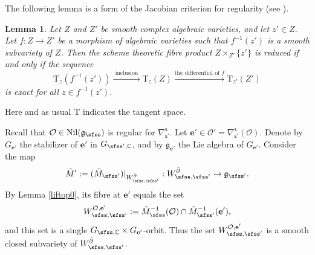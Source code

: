 \documentclass[12pt,a4paper]{amsart}
\newcommand{\CO}{{\mathcal {O}}}
\newcommand{\g}{\mathfrak g}
\newcommand{\X}{\mathbf{X}}
\def\DD{\nabla}
\newcommand{\be}{\begin {equation}}
\newcommand{\ee}{\end {equation}}
\numberwithin{equation}{section}
\newtheorem{lem}[thm]{Lemma}
\theoremstyle{remark}
\def\cOp{\cO^{\prime}}
\begin{document}
\def\Ks{{K}_{\sfss,\bC}}
\def\Ksp{{K}_{\sfss',\bC}}
\def\Kspo{{K}_{\sfss'_0,\bC}}
\def\Kspt{{K}_{\sfss'_1,\bC}}

\def\Gs{{G}_{\sfss}}
\def\Gsp{{G}_{\sfss'}}
\def\Gspo{{G}_{\sfss'_0}}
\def\Gspt{{G}_{\sfss'_1}}
\def\CMs{{\tilde M}_{\sfss}}
\def\CMsp{{\tilde M}_{\sfss'}}
\def\CMss{{\tilde M}_{\sfss,\sfss'}}
\def\Wss{{W_{\sfss,\sfss'}}}
\def\Woss{{W^{\circ}_{\sfss,\sfss'}}}
\def\CXss{\cX_{\sfss,\sfss'}}
\def\X{\bfee}
\def\Xp{{\bfee'}}
\def\Xpo{{\bfee'_0}}
\def\ww{\phi}
\def\wwo{\phi_0}
\def\sOp{\sO'}
\def\fggpsb{{\fgg^{\boxslash}_{\sfss'}}}
\def\fpppsb{{\fpp^{\boxslash}_{\sfss'}}}
\def\fpppso{\fpp_{\sfss'_0}}
\def\fpppst{\fpp_{\sfss'_1}}

\def\Vs{V_\sfss}
\def\Vsp{V_{\sfss'}}
\def\Vspp{V_{\sfss''}}
\def\Vspo{V_{\sfss'_0}}
\def\Vspt{V_{\sfss'_1}}
\def\Vspi{V_{\sfss'_i}}
\def\Wssi{W_{\sfss,\sfss'_i}}
\def\Wsso{W_{\sfss,\sfss'_0}}
\def\Wsst{W_{\sfss,\sfss'_1}}

\def\CXUO{\cX_{\sfss,\sfss'}^{\bar\partial ,\cOp}}
\def\CXOO{\cX_{\sfss,\sfss'}^{\cO ,\cOp}}



The following lemma is a form of  the Jacobian criterion for
regularity (see \cite[Theorem~2.19]{LiuAG}).
\begin{lem}\label{jacobic}
Let $Z$ and $Z'$ be smooth complex algebraic varieties, and let $z'\in Z$. Let $f: Z\rightarrow Z'$ be a morphism of algebraic varieties such that $f^{-1}(z')$ is a smooth subvariety of $Z$. Then the scheme theoretic fibre product $Z\times_{Z'} \{z'\}$ is reduced if and only if the sequence
\be\label{jc0}
  \mathrm T_z(f^{-1}(z'))\xrightarrow{\textrm{ inclusion }} \mathrm T_z(Z)\xrightarrow{\textrm{the differential of $f$}} \mathrm T_{z'}(Z')
\ee
is exact for all $z\in f^{-1}(z')$.
\end{lem}

Here and as usual $\mathrm T$ indicates the tangent space.

Recall that  $\CO\in \mathrm{Nil}(\g_\sfss)$ is regular for $\DD_{\mathsf s'}^{\mathsf s}$.
Let $\mathbf e'\in \CO'=\DD_{\mathsf s'}^{\mathsf s}(\CO)$. Denote by $G_{\mathbf e'}$ the stabilizer of $\mathbf e'$ in $G_{\sfss',\C}$, and by $\g_{\mathbf e'}$ the Lie algebra of $G_{\mathbf e'}$. Consider the map
\[
 \tilde M':=  (\tilde M_{\sfss'})|_{W_{\sfss, \sfss'}^{\bar \partial}} : W_{\sfss, \sfss'}^{\bar \partial}\rightarrow \g_{\sfss'}.
\]
By Lemma \ref{liftop0}, its fibre at $\mathbf e'$ equals the set
\[
W_{\sfss, \sfss'}^{\CO, \mathbf e'}:=\tilde M_{\sfss}^{-1}(\CO)\cap  \tilde M_{\sfss'}^{-1}(\mathbf e'),
\]
and this set is a single $G_{\sfss,\C}\times G_{\mathbf e'}$-orbit. Thus the set $W_{\sfss, \sfss'}^{\CO, \mathbf e'}$ is a smooth closed subvariety of $W_{\sfss, \sfss'}^{\bar \partial}$.
\end{document}
